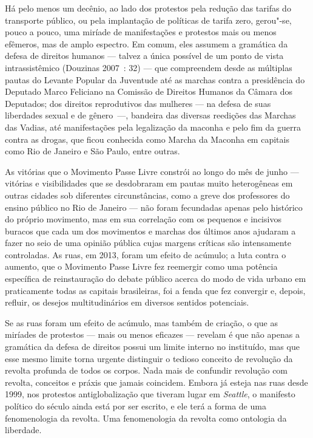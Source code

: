 Há pelo menos um decênio, ao lado dos protestos pela redução das tarifas
do transporte público, ou pela implantação de políticas de tarifa zero,
gerou"-se, pouco a pouco, uma miríade de manifestações e protestos mais
ou menos efêmeros, mas de amplo espectro. Em comum, eles assumem a
gramática da defesa de direitos humanos --- talvez a única possível de um
ponto de vista intrassistêmico (Douzinas 2007~: 32) --- que compreendem
desde as múltiplas pautas do Levante Popular da Juventude até as marchas
contra a presidência do Deputado Marco Feliciano na Comissão de Direitos
Humanos da Câmara dos Deputados; dos direitos reprodutivos das mulheres
--- na defesa de suas liberdades sexual e de gênero~---, bandeira das
diversas reedições das Marchas das Vadias, até manifestações pela
legalização da maconha e pelo fim da guerra contra as drogas, que ficou
conhecida como Marcha da Maconha em capitais como Rio de Janeiro e São
Paulo, entre outras.

As vitórias que o Movimento Passe Livre constrói ao longo do mês de
junho --- vitórias e visibilidades que se desdobraram em pautas muito
heterogêneas em outras cidades sob diferentes circunstâncias, como a
greve dos professores do ensino público no Rio de Janeiro --- não foram
fecundadas apenas pelo histórico do próprio movimento, mas em sua
correlação com os pequenos e incisivos buracos que cada um dos
movimentos e marchas dos últimos anos ajudaram a fazer no seio de uma
opinião pública cujas margens críticas são intensamente controladas. As
ruas, em 2013, foram um efeito de acúmulo; a luta contra o aumento, que
o Movimento Passe Livre fez reemergir como uma potência específica de
reinstauração do debate público acerca do modo de vida urbano em
praticamente todas as capitais brasileiras, foi a fenda que fez
convergir e, depois, refluir, os desejos multitudinários em diversos
sentidos potenciais.

Se as ruas foram um efeito de acúmulo, mas também de criação, o que as
miríades de protestos --- mais ou menos eficazes --- revelam é que não
apenas a gramática da defesa de direitos possui um limite interno no
instituído, mas que esse mesmo limite torna urgente distinguir o tedioso
conceito de revolução da revolta profunda de todos os corpos. Nada mais
de confundir revolução com revolta, conceitos e práxis que jamais
coincidem. Embora já esteja nas ruas desde 1999, nos protestos
antiglobalização que tiveram lugar em \emph{Seattle}, o manifesto
político do século  ainda está por ser escrito, e ele terá a forma de
uma fenomenologia da revolta. Uma fenomenologia da revolta como
ontologia da liberdade.

